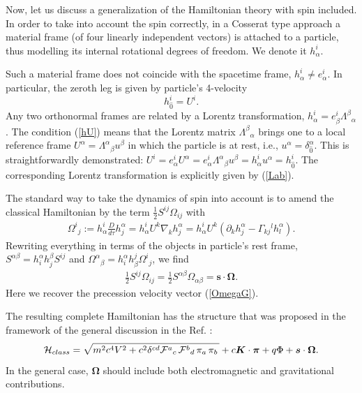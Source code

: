 \documentclass[preprint,showpacs,preprintnumbers,eqsecnum,amsmath,amssymb]{revtex4-1}
\begin{document}
Now, let us discuss a generalization of the Hamiltonian theory with spin
included. In order to take into account the spin correctly, in a Cosserat type
approach a material frame (of four linearly independent vectors) is attached
to a particle, thus modelling its internal rotational degrees of freedom.
We denote it $h^i_\alpha$.

Such a material frame does not coincide with the spacetime frame, $h^i_\alpha
\neq e^i_\alpha$. In particular, the zeroth leg is given by particle's 4-velocity
\begin{equation}
h^i_{\widehat 0} = U^i.\label{hU}
\end{equation}
Any two orthonormal frames are related by a Lorentz transformation,
$h^i_\alpha = e^i_\beta\Lambda^\beta{}_\alpha$. The condition (\ref{hU}) means
that the Lorentz matrix $\Lambda^\beta{}_\alpha$ brings one to a local
reference frame $U^\alpha = \Lambda^\alpha{}_\beta u^\beta$ in which the particle
is at rest, i.e., $u^\alpha = \delta^\alpha_{\widehat 0}$. This is straightforwardly
demonstrated: $U^i = e^i_\alpha U^\alpha = e^i_\alpha \Lambda^\alpha{}_\beta u^\beta
= h^i_\alpha u^\alpha = h^i_{\widehat 0}$. The corresponding Lorentz transformation
is explicitly given by (\ref{Lab}).

The standard way to take the dynamics of spin into account
\cite{Porto,Bar,Stein} is to amend the classical Hamiltonian by
the term ${\frac 12}S^{ij}\Omega_{ij}$ with
\begin{eqnarray}\label{Omij}
\Omega^i{}_j := h^i_\alpha {\frac D{d\tau}} h^\alpha_j = h^i_\alpha U^k\nabla_k h^\alpha_j
= h^i_\alpha U^k\left(\partial_k h^\alpha_j - \Gamma_{kj}{}^lh^\alpha_l\right).
\end{eqnarray}
Rewriting everything in terms of the objects in particle's rest frame, $S^{\alpha\beta}
= h^\alpha_ih^\beta_jS^{ij}$ and $\Omega^\alpha{}_\beta = h_i^\alpha h_\beta^j\Omega^i{}_j$,
we find
\begin{eqnarray}
{\frac 12}S^{ij}\Omega_{ij} = {\frac 12}S^{\alpha\beta}\Omega_{\alpha\beta} = \bm s\cdot\bm\Omega.
\end{eqnarray}
Here we recover the precession velocity vector (\ref{OmegaG}).

The resulting complete Hamiltonian has the structure that was proposed in the
framework of the general discussion in the Ref. \cite{PK}:
\begin{equation}
{\cal H}_{class}=\sqrt{m^2c^4V^2 + c^2\delta^{cd}{\cal
F}^a{}_c\,{\cal F}^b{}_d \,\pi_a\,\pi_b\,} + c{\bm K}\cdot{\bm
\pi} + q\Phi+ \bm s\cdot\bm\Omega.\label{clasnewadded}
\end{equation}
In the general case, $\bm\Omega$ should include both electromagnetic and
gravitational contributions.
\end{document}
